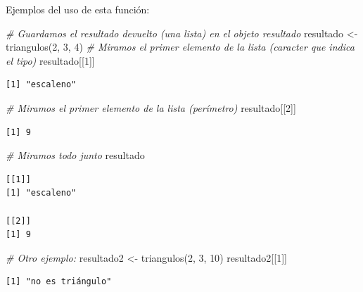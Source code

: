 \documentclass[
]{book}
\newenvironment{Shaded}{\begin{snugshade}}{\end{snugshade}}
\newcommand{\CommentTok}[1]{\textcolor[rgb]{0.56,0.35,0.01}{\textit{#1}}}
\newcommand{\DecValTok}[1]{\textcolor[rgb]{0.00,0.00,0.81}{#1}}
\newcommand{\FunctionTok}[1]{\textcolor[rgb]{0.00,0.00,0.00}{#1}}
\newcommand{\NormalTok}[1]{#1}
\newcommand{\OtherTok}[1]{\textcolor[rgb]{0.56,0.35,0.01}{#1}}
\begin{document}
Ejemplos del uso de esta función:

\begin{Shaded}
\begin{Highlighting}[]
\CommentTok{\# Guardamos el resultado devuelto (una lista) en el objeto resultado}
\NormalTok{resultado }\OtherTok{\textless{}{-}} \FunctionTok{triangulos}\NormalTok{(}\DecValTok{2}\NormalTok{, }\DecValTok{3}\NormalTok{, }\DecValTok{4}\NormalTok{)}
\CommentTok{\# Miramos el primer elemento de la lista (caracter que indica el tipo)}
\NormalTok{resultado[[}\DecValTok{1}\NormalTok{]]}
\end{Highlighting}
\end{Shaded}

\begin{verbatim}
[1] "escaleno"
\end{verbatim}

\begin{Shaded}
\begin{Highlighting}[]
\CommentTok{\# Miramos el primer elemento de la lista (perímetro)}
\NormalTok{resultado[[}\DecValTok{2}\NormalTok{]]}
\end{Highlighting}
\end{Shaded}

\begin{verbatim}
[1] 9
\end{verbatim}

\begin{Shaded}
\begin{Highlighting}[]
\CommentTok{\# Miramos todo junto}
\NormalTok{resultado}
\end{Highlighting}
\end{Shaded}

\begin{verbatim}
[[1]]
[1] "escaleno"

[[2]]
[1] 9
\end{verbatim}

\begin{Shaded}
\begin{Highlighting}[]
\CommentTok{\# Otro ejemplo:}
\NormalTok{resultado2 }\OtherTok{\textless{}{-}} \FunctionTok{triangulos}\NormalTok{(}\DecValTok{2}\NormalTok{, }\DecValTok{3}\NormalTok{, }\DecValTok{10}\NormalTok{)}
\NormalTok{resultado2[[}\DecValTok{1}\NormalTok{]]}
\end{Highlighting}
\end{Shaded}

\begin{verbatim}
[1] "no es triángulo"
\end{verbatim}
\end{document}
